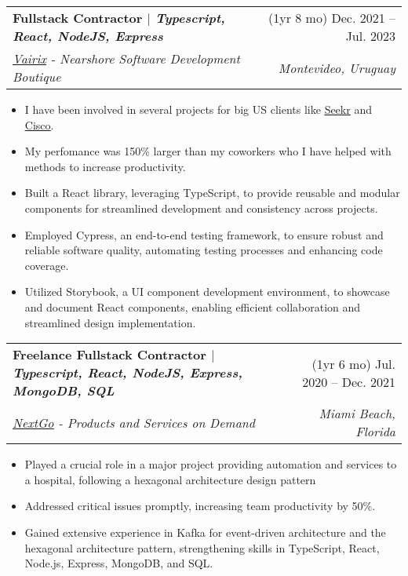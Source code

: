 \documentclass[letterpaper,11pt]{article}
\makeatletter
\newcommand{\resumeItem}[1]{
  \item\small{
    {#1 \vspace{-2pt}}
  }
}
\newcommand{\resumeSubheading}[4]{
  \vspace{-2pt}\item
    \begin{tabular*}{0.97\textwidth}[t]{l@{\extracolsep{\fill}}r}
      \textbf{#1} & #2 \\
      \textit{\small#3} & \textit{\small #4} \\
    \end{tabular*}\vspace{-7pt}
}
\newcommand{\resumeItemListStart}{\begin{itemize}}
\newcommand{\resumeItemListEnd}{\end{itemize}\vspace{-5pt}}
\makeatother
\begin{document}
\resumeSubheading
{Fullstack Contractor $|$ \normalfont \emph{Typescript, React, NodeJS,  Express }}{(1yr 8 mo) Dec. 2021 -- Jul. 2023}
{\href{https://vairix.com/}{\underline{Vairix}}  -   Nearshore Software Development Boutique}{Montevideo, Uruguay}
\resumeItemListStart
\resumeItem{I have been involved in several projects for big US clients like \href{https://www.news.seekr.com}{\underline{Seekr}} and  \href{https://www.cisco.com/}{\underline{Cisco}}.}
\resumeItem{My perfomance was 150\% larger than my coworkers who I have helped with methods to increase productivity.}
\resumeItem{Built a React library, leveraging TypeScript, to provide reusable and modular components for streamlined development and consistency across projects.}
\resumeItem{Employed Cypress, an end-to-end testing framework, to ensure robust and reliable software quality, automating testing processes and enhancing code coverage.}
\resumeItem{Utilized Storybook, a UI component development environment, to showcase and document React components, enabling efficient collaboration and streamlined design implementation.}
\resumeItemListEnd



\resumeSubheading
{Freelance Fullstack Contractor $|$ \normalfont \emph{Typescript, React, NodeJS,  Express, MongoDB, SQL }}{(1yr 6 mo) Jul. 2020 -- Dec. 2021}
{\href{https://www.linkedin.com/company/nextgollc/}{\underline{NextGo}} -  Products and Services on Demand}{Miami Beach, Florida}
\resumeItemListStart
\resumeItem{Played a crucial role in a major project providing automation and services to a hospital, following a hexagonal architecture design pattern}
\resumeItem{Addressed critical issues promptly, increasing team productivity by 50\%.}
\resumeItem{Gained extensive experience in Kafka for event-driven architecture and the hexagonal architecture pattern, strengthening skills in TypeScript, React, Node.js, Express, MongoDB, and SQL.}
\resumeItemListEnd
\end{document}
